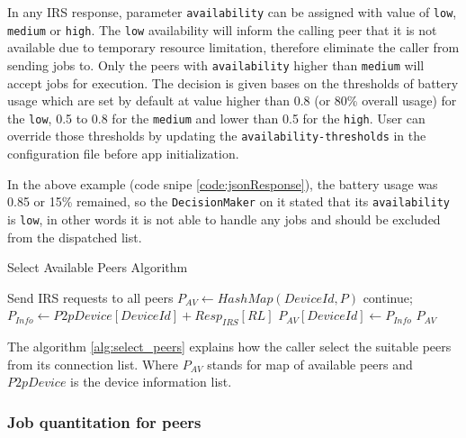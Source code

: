 \documentclass[conference]{IEEEtran}
\begin{document}
In any IRS response, parameter \texttt{availability} can be assigned with value of \texttt{low}, \texttt{medium} or \texttt{high}. The \texttt{low} availability will inform the calling peer that it is not available due to temporary resource limitation, therefore eliminate the caller from sending jobs to. Only the peers with \texttt{availability} higher than \texttt{medium} will accept jobs for execution. The decision is given bases on the thresholds of battery usage which are set by default at value higher than 0.8 (or 80\% overall usage) for the \texttt{low}, 0.5 to 0.8 for the \texttt{medium} and lower than 0.5 for the \texttt{high}. User can override those thresholds by updating the \texttt{availability-thresholds} in the configuration file before app initialization. 

In the above example (code snipe \ref{code:jsonResponse}), the battery usage was 0.85 or 15\% remained, so the \texttt{DecisionMaker} on it stated that its \texttt{availability} is \texttt{low}, in other words it is not able to handle any jobs and should be excluded from the dispatched list.

\begin{algorithm}

\caption{Select Available Peers Algorithm}
\label{alg:select_peers}
\begin{algorithmic}[1] 
\begin{footnotesize}
\State Send IRS requests to all peers 
\State $P_{AV} \leftarrow HashMap(DeviceId, P)$
   \State continue;
\Else
  \State $P_{Info} \leftarrow P2pDevice[DeviceId] + Resp_{IRS}[RL]$
  \State $P_{AV}[DeviceId] \leftarrow P_{Info}$
\EndIf
\EndFor
\State \Return $P_{AV}$
\EndFunction
\end{footnotesize}
\end{algorithmic}

\end{algorithm}

The algorithm \ref{alg:select_peers} explains how the caller select the suitable peers from its connection list. Where $P_{AV}$ stands for map of available peers and $P2pDevice$ is the device information list.\\

\subsubsection{Job quantitation for peers}\label{ss_jqfp}
\end{document}
